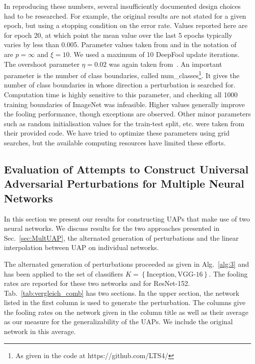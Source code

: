 \documentclass[runningheads]{llncs}
\begin{document}
In reproducing these numbers, several insufficiently documented design choices had to be researched. For example, the original results are not stated for a given epoch, but using a stopping condition on the error rate. Values reported here are for epoch 20, at which point the mean value over the last 5 epochs typically varies by less than 0.005. Parameter values taken from and in the notation of~\cite{DeepFool-Moosavi-Dezfooli15} are \(p=\infty\) and \(\xi=10\). We used a maximum of 10 DeepFool update iterations. The overshoot parameter \(\eta=0.02\) was again taken from~\cite{DeepFool-Moosavi-Dezfooli15}. 
An important parameter is the number of class boundaries, called num\_classes\footnote{As given in the code at https://github.com/LTS4/}. It gives the number of class boundaries in whose direction a perturbation is searched for. Computation time is highly sensitive to this parameter, and checking all 1000 training boundaries of ImageNet was infeasible. Higher values generally improve the fooling performance, though exceptions are observed. 
Other minor parameters such as random initialisation values for the train-test split, etc. were taken from their provided code. We have tried to optimize these parameters using grid searches, but the available computing resources have limited these efforts. 

\subsection{Evaluation of Attempts to Construct Universal Adversarial Perturbations for Multiple Neural Networks}
In this section we present our results for constructing UAPs that make use of two neural networks. We discuss results for the two approaches presented in Sec.~\ref{sec:MultUAP}, the alternated generation of perturbations and the linear interpolation between UAP on individual networks.

The alternated generation of perturbations proceeded as given in Alg.~\ref{alg:3} and has been applied to the set of classifiers \(K=\left\{\text{Inception},\text{VGG-16}\right\}\). The fooling rates are reported for these two networks and for ResNet-152. Tab.~\ref{tab:vergleich_comb} has two sections. In the upper section, the network listed in the first column is used to generate the perturbation. The columns give the fooling rates on the network given in the column title as well as their average as our measure for the generalizability of the UAPs. We include the original network in this average. 
\end{document}
